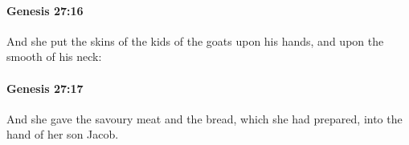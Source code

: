 		\paragraph{Genesis 27:16} %
			\label{GENESIS-27-16}

			And she put the skins of the kids of the goats upon his hands, and upon the smooth of his neck:


		\paragraph{Genesis 27:17} %
			\label{GENESIS-27-17}

			And she gave the savoury meat and the bread, which she had prepared, into the hand of her son Jacob.


